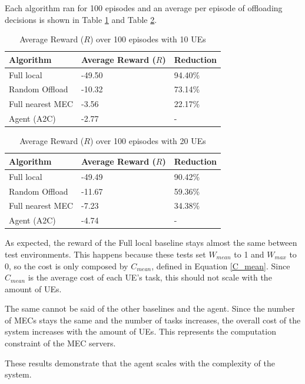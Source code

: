 \hfill \break
Each algorithm ran for 100 episodes and an average per episode of offloading decisions is shown in Table \ref{results_5_10} and Table \ref{results_5_20}.

\begin{table}[H]
\centering
\begin{tabular}{|l|l|l|}
\hline
Algorithm        & Average Reward ($R$) & Reduction\\ \hline
Full local       & -49.50 & 94.40\%\\
Random Offload   & -10.32 & 73.14\%\\
Full nearest MEC & -3.56 & 22.17\%\\ 
Agent (A2C) & -2.77 & -\\ \hline
\end{tabular}
\caption{Average Reward ($R$) over 100 episodes with 10 \acrshort{UE}s} \label{results_5_10}
\end{table}

\begin{table}[H]
\centering
\begin{tabular}{|l|l|l|}
\hline
Algorithm        & Average Reward ($R$) & Reduction\\ \hline
Full local       & -49.49 & 90.42\%\\
Random Offload   & -11.67 & 59.36\%\\
Full nearest MEC & -7.23 & 34.38\%\\ 
Agent (A2C) & -4.74 & -\\ \hline
\end{tabular}
\caption{Average Reward ($R$) over 100 episodes with 20 \acrshort{UE}s} \label{results_5_20}
\end{table}

As expected, the reward of the Full local baseline stays almost the same between test environments. This happens because these tests set $W_{mean}$ to 1 and $W_{max}$ to 0, so the cost is only composed by $C_{mean}$, defined in Equation \ref{C_mean}. Since $C_{mean}$ is the average cost of each \acrshort{UE}'s task, this should not scale with the amount of \acrshort{UE}s.

The same cannot be said of the other baselines and the agent. Since the number of \acrshort{MEC}s stays the same and the number of tasks increases, the overall cost of the system increases with the amount of \acrshort{UE}s. This represents the computation constraint of the \acrshort{MEC} servers. 

These results demonstrate that the agent scales with the complexity of the system.

